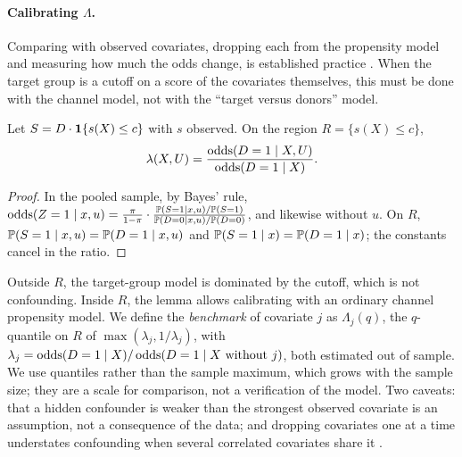 \paragraph{Calibrating $\Lambda$.} Comparing with observed covariates, dropping each from the propensity model and measuring how much the odds change, is established practice \citep{mcclean2024,baitairian2025}. When the target group is a cutoff on a score of the covariates themselves, this must be done with the channel model, not with the ``target versus donors'' model.

\begin{lemma}\label{lem:calibration}
Let $S=D\cdot\mathbf{1}\{s(X)\le c\}$ with $s$ observed. On the region $R=\{s(X)\le c\}$,
\[
\lambda(X,U)=\frac{\operatorname{odds}(D=1\mid X,U)}{\operatorname{odds}(D=1\mid X)}.
\]
\end{lemma}
\begin{proof}
In the pooled sample, by Bayes' rule, $\operatorname{odds}(Z=1\mid x,u)=\frac{\pi}{1-\pi}\cdot\frac{\mathbb{P}(S=1\mid x,u)/\mathbb{P}(S=1)}{\mathbb{P}(D=0\mid x,u)/\mathbb{P}(D=0)}$, and likewise without $u$. On $R$, $\mathbb{P}(S=1\mid x,u)=\mathbb{P}(D=1\mid x,u)$ and $\mathbb{P}(S=1\mid x)=\mathbb{P}(D=1\mid x)$; the constants cancel in the ratio.
\end{proof}

Outside $R$, the target-group model is dominated by the cutoff, which is not confounding. Inside $R$, the lemma allows calibrating with an ordinary channel propensity model. We define the \emph{benchmark} of covariate $j$ as $\Lambda_j(q)$, the $q$-quantile on $R$ of $\max(\lambda_j,1/\lambda_j)$, with $\lambda_j=\operatorname{odds}(D=1\mid X)/\operatorname{odds}(D=1\mid X\text{ without }j)$, both estimated out of sample. We use quantiles rather than the sample maximum, which grows with the sample size; they are a scale for comparison, not a verification of the model. Two caveats: that a hidden confounder is weaker than the strongest observed covariate is an assumption, not a consequence of the data; and dropping covariates one at a time understates confounding when several correlated covariates share it \citep{mcclean2024}.

